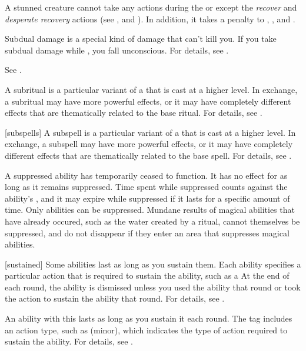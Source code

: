  A stunned creature cannot take any actions during the  or  except the \textit{recover} and \textit{desperate recovery} actions (see , and ).
In addition, it takes a  penalty to , , and .

 Subdual damage is a special kind of damage that can't kill you.
If you take subdual damage while , you fall unconscious.
For details, see .

 See .

 A subritual is a particular variant of a  that is cast at a higher level.
In exchange, a subritual may have more powerful effects, or it may have completely different effects that are thematically related to the base ritual.
For details, see .

[subspells] A subspell is a particular variant of a  that is cast at a higher level.
In exchange, a subspell may have more powerful effects, or it may have completely different effects that are thematically related to the base spell.
For details, see .

 A suppressed ability has temporarily ceased to function.
It has no effect for as long as it remains suppressed.
Time spent while suppressed counts against the ability's , and it may expire while suppressed if it lasts for a specific amount of time.
Only  abilities can be suppressed.
Mundane results of magical abilities that have already occured, such as the water created by a  ritual, cannot themselves be suppressed, and do not disappear if they enter an area that suppresses magical abilities.

[sustained] Some abilities last as long as you sustain them.
Each ability specifies a particular action that is required to sustain the ability, such as a 
At the end of each round, the ability is dismissed unless you used the ability that round or took the action to sustain the ability that round.
For details, see .

 An ability with this  lasts as long as you sustain it each round.
The tag includes an action type, such as (minor), which indicates the type of action required to sustain the ability.
For details, see .

